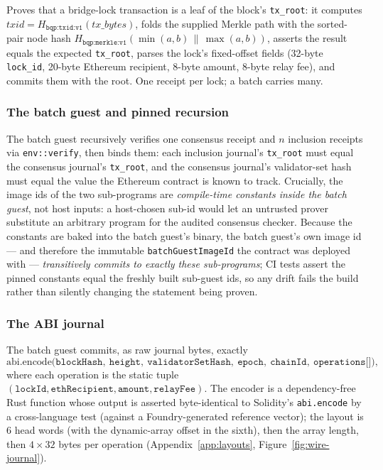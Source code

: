 \documentclass[11pt]{article}
\newcommand{\code}[1]{\texttt{#1}}
\newcommand{\concat}{\,\|\,}
\theoremstyle{plain}
\theoremstyle{definition}
\theoremstyle{remark}
\begin{document}
Proves that a bridge-lock transaction is a leaf of the block's
\code{tx\_root}: it computes $\mathit{txid} =
H_{\code{bqp:txid:v1}}(\mathit{tx\_bytes})$, folds the supplied Merkle path
with the sorted-pair node hash
$H_{\code{bqp:merkle:v1}}(\min(a,b) \concat \max(a,b))$, asserts the result
equals the expected \code{tx\_root}, parses the lock's fixed-offset fields
(32-byte \code{lock\_id}, 20-byte Ethereum recipient, 8-byte amount, 8-byte
relay fee), and commits them with the root. One receipt per lock; a batch
carries many.

\subsubsection{The batch guest and pinned recursion}
\label{sec:batch-guest}

The batch guest recursively verifies one consensus receipt and $n$ inclusion
receipts via \code{env::verify}, then binds them: each inclusion journal's
\code{tx\_root} must equal the consensus journal's \code{tx\_root}, and the
consensus journal's validator-set hash must equal the value the Ethereum
contract is known to track. Crucially, the image ids of the two sub-programs
are \emph{compile-time constants inside the batch guest}, not host inputs: a
host-chosen sub-id would let an untrusted prover substitute an arbitrary
program for the audited consensus checker. Because the constants are baked
into the batch guest's binary, the batch guest's own image id ---
and therefore the immutable \code{batchGuestImageId} the contract was
deployed with --- \emph{transitively commits to exactly these sub-programs};
CI tests assert the pinned constants equal the freshly built sub-guest ids,
so any drift fails the build rather than silently changing the statement
being proven.

\subsubsection{The ABI journal}
\label{sec:journal}

The batch guest commits, as raw journal bytes, exactly
\[
\mathrm{abi.encode}\big(\code{blockHash},\ \code{height},\
\code{validatorSetHash},\ \code{epoch},\ \code{chainId},\
\code{operations[]}\big),
\]
where each operation is the static tuple
$(\code{lockId}, \code{ethRecipient}, \code{amount}, \code{relayFee})$.
The encoder is a dependency-free Rust function whose output is asserted
byte-identical to Solidity's \code{abi.encode} by a cross-language test
(against a Foundry-generated reference vector); the layout is
6 head words (with the dynamic-array offset in the sixth), then the array
length, then $4 \times 32$ bytes per operation
(Appendix~\ref{app:layouts}, Figure~\ref{fig:wire-journal}).
\end{document}
